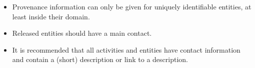 


\begin{itemize}

\item Provenance information can only be given for uniquely identifiable entities, at least inside their domain.

\item Released entities should have a main contact.

\item It is recommended that all activities and entities have contact information and contain a (short) description or link to a description.

\end{itemize}


%

